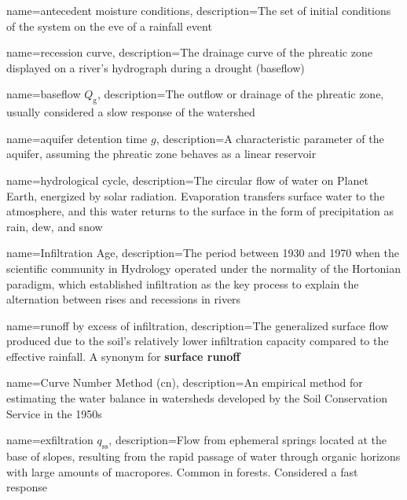 {
    name=antecedent moisture conditions,
    description={The set of initial conditions of the system on the eve of a rainfall event}
}

{
    name=recession curve,
    description={The drainage curve of the phreatic zone displayed on a river's hydrograph during a drought (baseflow)}
}

{
    name=baseflow $Q_{\text{g}}$,
    description={The outflow or drainage of the phreatic zone, usually considered a slow response of the watershed}
}

{
    name=aquifer detention time $g$,
    description={A characteristic parameter of the aquifer, assuming the phreatic zone behaves as a linear reservoir}
}

{
    name=hydrological cycle,
    description={The circular flow of water on Planet Earth, energized by solar radiation. Evaporation transfers surface water to the atmosphere, and this water returns to the surface in the form of precipitation as rain, dew, and snow}
}

{
    name=Infiltration Age,
    description={The period between 1930 and 1970 when the scientific community in Hydrology operated under the normality of the Hortonian paradigm, which established infiltration as the key process to explain the alternation between rises and recessions in rivers}
}

{
    name=runoff by excess of infiltration,
    description={The generalized surface flow produced due to the soil's relatively lower infiltration capacity compared to the effective rainfall. A synonym for \textbf{surface runoff}}
}

{
    name=Curve Number Method (\acrfull{cn}),
    description={An empirical method for estimating the water balance in watersheds developed by the Soil Conservation Service in the 1950s}
}

{
    name=exfiltration $q_{\text{ss}}$,
    description={Flow from ephemeral springs located at the base of slopes, resulting from the rapid passage of water through organic horizons with large amounts of macropores. Common in forests. Considered a fast response}
}

